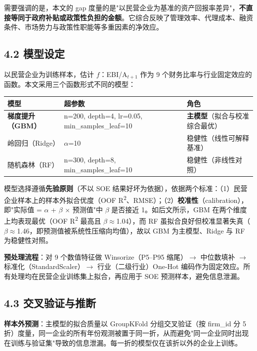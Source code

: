 \documentclass[11pt,a4paper]{ctexart}
\begin{document}
需要强调的是，本文的 gap 度量的是"以民营企业为基准的资产回报率差异"，\textbf{不直接等同于政府补贴或政策性负担的金额}。它综合反映了管理效率、代理成本、融资条件、市场势力与政策性职能等多重因素的净效应。

\subsection{4.2 模型设定}

以民营企业为训练样本，估计 \(f\)：EBI/A\(_{t+1}\) 作为 9 个财务比率与行业固定效应的函数。本文采用三个函数形式不同的模型：

\begin{center}
\centering
\small
\begin{tabular}{lll}
\toprule
模型 & 超参数 & 角色 \\
\midrule
\textbf{梯度提升（GBM）} & n=200, depth=4, lr=0.05, min\_samples\_leaf=10 & \textbf{主模型}（拟合与校准综合最优） \\
岭回归（Ridge） & $\alpha$=10 & 稳健性（线性可解释基准） \\
随机森林（RF） & n=300, depth=8, min\_samples\_leaf=10 & 稳健性（非线性对照） \\
\bottomrule
\end{tabular}
\end{center}

模型选择遵循\textbf{先验原则}（不以 SOE 结果好坏为依据），依据两个标准：（1）民营企业样本上的样本外拟合优度（OOF R\textsuperscript{2}、RMSE）；（2）\textbf{校准性}（calibration），即"实际值 = $\alpha$ + $\beta$ $\times$ 预测值"中 $\beta$ 是否接近 1。如后文所示，GBM 在两个维度上均表现最优（OOF R\textsuperscript{2} 最高且 $\beta$$\approx$1.04），而 RF 虽拟合良好但校准显著失真（$\beta$$\approx$1.46，即预测值被系统性压缩向均值），故以 GBM 为主模型、Ridge 与 RF 为稳健性对照。

\textbf{预处理流程}：对 9 个数值特征做 Winsorize（P5--P95 缩尾）$\to$ 中位数填补 $\to$ 标准化（StandardScaler）$\to$ 行业（二级行业）One-Hot 编码作为固定效应。所有处理均在民营企业训练集上拟合，再应用于 SOE 预测样本，避免信息泄漏。

\subsection{4.3 交叉验证与推断}

\textbf{样本外预测}：主模型的拟合质量以 GroupKFold 分组交叉验证（按 firm\_id 分 5 折）度量，同一企业的所有年份观测被置于同一折，从而避免"同一企业同时出现在训练与验证集"导致的信息泄漏。每一折的模型仅在该折以外的企业上训练。
\end{document}
